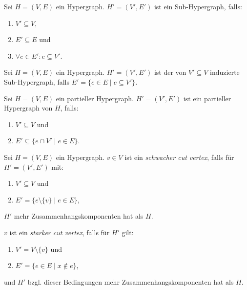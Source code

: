 \begin{definition}
    Sei $ H = (V, E) $ ein Hypergraph.
    $ H' = (V', E') $ ist ein Sub-Hypergraph, falls:
    \begin{enumerate}
        \item $ V' \subseteq V $,
        \item $ E' \subseteq E $ und
        \item $ \forall e \in E': e \subseteq V' $.
    \end{enumerate}
\end{definition}

\begin{definition}
    Sei $ H = (V, E) $ ein Hypergraph.
    $ H' = (V', E') $ ist der von $ V' \subseteq V $ induzierte Sub-Hypergraph, falls $ E' = \{ e \in E \mid e \subseteq V' \} $.
\end{definition}

\begin{definition}
    Sei $ H = (V, E) $ ein partieller Hypergraph.
    $ H' = (V', E') $ ist ein partieller Hypergraph von $ H $, falls:
    \begin{enumerate}
        \item $ V' \subseteq V $ und
        \item $ E' \subseteq \{ e \cap V' \mid e \in E \} $.
    \end{enumerate}
\end{definition}

\begin{definition}
    Sei $ H = (V, E) $ ein Hypergraph.
    $ v \in V $ ist ein \textit{schwacher cut vertex}, falls für $ H' = (V', E') $ mit:
    \begin{enumerate}
        \item $ V' \subseteq V $ und
        \item $ E' = \{ e \setminus \{ v \} \mid e \in E \} $,
    \end{enumerate}
    $ H' $ mehr Zusammenhangskomponenten hat als $ H $.

    $ v $ ist ein \textit{starker cut vertex}, falls für $ H' $ gilt:
    \begin{enumerate}
        \item $ V' = V \setminus \{ v \} $ und
        \item $ E' = \{ e \in E \mid x \notin e \} $,
    \end{enumerate}
    und $ H' $ bzgl. dieser Bedingungen mehr Zusammenhangskomponenten hat als $ H $.
\end{definition}

